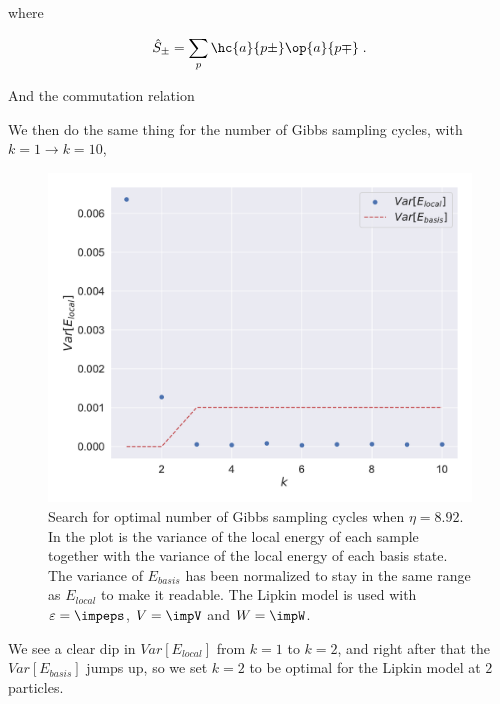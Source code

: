 where

\begin{equation}
  \hat{S}_{\pm} = \sum_p \hc{a}{p\pm}\op{a}{p\mp} \; . 
  \label{eq:s_pm}
\end{equation}

And the commutation relation

We then do the same thing for the number of Gibbs sampling cycles, with $k = 1 \rightarrow k=10$,
\begin{figure}[H]
  \begin{center}
    \includegraphics[width=\optgridwidhtratio\textwidth]{Figures/Plots/OPt/Lipkin/[2][gibbs_k][e=500][1-10].pdf}
  \end{center}
  \caption{Search for optimal number of Gibbs sampling cycles when $\eta = 8.92$. In the plot is the variance of the local energy of each sample together with the variance of the local energy of each basis state. The variance of $E_{basis}$ has been normalized to stay in the same range as $E_{local}$ to make it readable. The Lipkin model is used with $\varepsilon = \impeps$, $V = \impV$ and $W = \impW$.}\label{fig:hn_depth2}
\end{figure}

We see a clear dip in $Var[E_{local}]$ from $k =1$ to $k=2$, and right after that the $Var[E_{basis}]$ jumps up, so we set $k=2$ to be optimal for the Lipkin model at $2$ particles. 
